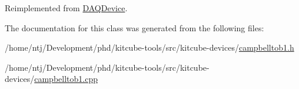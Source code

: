 Reimplemented from \hyperlink{classDAQDevice_af5fa373af9a089c18c7fd1d662db144f}{D\-A\-Q\-Device}.



The documentation for this class was generated from the following files\-:\begin{DoxyCompactItemize}
\item 
/home/ntj/\-Development/phd/kitcube-\/tools/src/kitcube-\/devices/\hyperlink{campbelltob1_8h}{campbelltob1.\-h}\item 
/home/ntj/\-Development/phd/kitcube-\/tools/src/kitcube-\/devices/\hyperlink{campbelltob1_8cpp}{campbelltob1.\-cpp}\end{DoxyCompactItemize}
